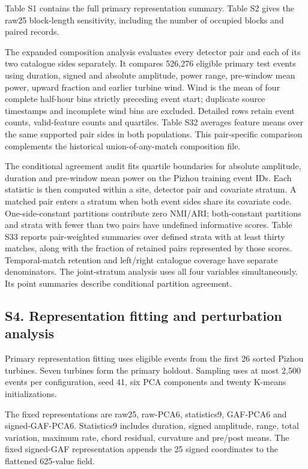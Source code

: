\documentclass[a4paper,11pt]{article}
\begin{document}
Table S1 contains the full primary representation summary. Table S2 gives the raw25 block-length sensitivity, including the number of occupied blocks and paired records.

The expanded composition analysis evaluates every detector pair and each of its two catalogue sides separately. It compares 526,276 eligible primary test events using duration, signed and absolute amplitude, power range, pre-window mean power, upward fraction and earlier turbine wind. Wind is the mean of four complete half-hour bins strictly preceding event start; duplicate source timestamps and incomplete wind bins are excluded. Detailed rows retain event counts, valid-feature counts and quartiles. Table S32 averages feature means over the same supported pair sides in both populations. This pair-specific comparison complements the historical union-of-any-match composition file.

The conditional agreement audit fits quartile boundaries for absolute amplitude, duration and pre-window mean power on the Pizhou training event IDs. Each statistic is then computed within a site, detector pair and covariate stratum. A matched pair enters a stratum when both event sides share its covariate code. One-side-constant partitions contribute zero NMI/ARI; both-constant partitions and strata with fewer than two pairs have undefined informative scores. Table S33 reports pair-weighted summaries over defined strata with at least thirty matches, along with the fraction of retained pairs represented by those scores. Temporal-match retention and left/right catalogue coverage have separate denominators. The joint-stratum analysis uses all four variables simultaneously. Its point summaries describe conditional partition agreement.

\subsection{S4. Representation fitting and perturbation analysis}\label{s4.-representation-fitting-and-perturbation-analysis}

Primary representation fitting uses eligible events from the first 26 sorted Pizhou turbines. Seven turbines form the primary holdout. Sampling uses at most 2,500 events per configuration, seed 41, six PCA components and twenty K-means initializations.

The fixed representations are raw25, raw-PCA6, statistics9, GAF-PCA6 and signed-GAF-PCA6. Statistics9 includes duration, signed amplitude, range, total variation, maximum rate, chord residual, curvature and pre/post means. The fixed signed-GAF representation appends the 25 signed coordinates to the flattened 625-value field.
\end{document}
